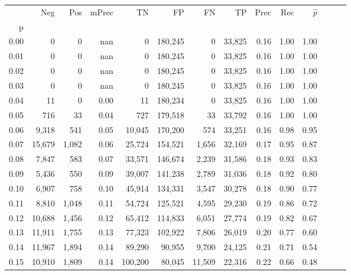 \begin{tabular}{rrrrrrrrrrrrrr}
\toprule
{} &     Neg &    Pos & mPrec &       TN &       FP &      FN &      TP &  Prec &   Rec & $\hat{p}$ \\
p    &         &        &       &          &          &         &         &       &       &           \\
\midrule
0.00 &       0 &      0 &   nan &        0 &  180,245 &       0 &  33,825 &  0.16 &  1.00 &      1.00 \\
0.01 &       0 &      0 &   nan &        0 &  180,245 &       0 &  33,825 &  0.16 &  1.00 &      1.00 \\
0.02 &       0 &      0 &   nan &        0 &  180,245 &       0 &  33,825 &  0.16 &  1.00 &      1.00 \\
0.03 &       0 &      0 &   nan &        0 &  180,245 &       0 &  33,825 &  0.16 &  1.00 &      1.00 \\
0.04 &      11 &      0 &  0.00 &       11 &  180,234 &       0 &  33,825 &  0.16 &  1.00 &      1.00 \\
0.05 &     716 &     33 &  0.04 &      727 &  179,518 &      33 &  33,792 &  0.16 &  1.00 &      1.00 \\
0.06 &   9,318 &    541 &  0.05 &   10,045 &  170,200 &     574 &  33,251 &  0.16 &  0.98 &      0.95 \\
0.07 &  15,679 &  1,082 &  0.06 &   25,724 &  154,521 &   1,656 &  32,169 &  0.17 &  0.95 &      0.87 \\
0.08 &   7,847 &    583 &  0.07 &   33,571 &  146,674 &   2,239 &  31,586 &  0.18 &  0.93 &      0.83 \\
0.09 &   5,436 &    550 &  0.09 &   39,007 &  141,238 &   2,789 &  31,036 &  0.18 &  0.92 &      0.80 \\
0.10 &   6,907 &    758 &  0.10 &   45,914 &  134,331 &   3,547 &  30,278 &  0.18 &  0.90 &      0.77 \\
0.11 &   8,810 &  1,048 &  0.11 &   54,724 &  125,521 &   4,595 &  29,230 &  0.19 &  0.86 &      0.72 \\
0.12 &  10,688 &  1,456 &  0.12 &   65,412 &  114,833 &   6,051 &  27,774 &  0.19 &  0.82 &      0.67 \\
0.13 &  11,911 &  1,755 &  0.13 &   77,323 &  102,922 &   7,806 &  26,019 &  0.20 &  0.77 &      0.60 \\
0.14 &  11,967 &  1,894 &  0.14 &   89,290 &   90,955 &   9,700 &  24,125 &  0.21 &  0.71 &      0.54 \\
0.15 &  10,910 &  1,809 &  0.14 &  100,200 &   80,045 &  11,509 &  22,316 &  0.22 &  0.66 &      0.48 \\

\end{tabular}
